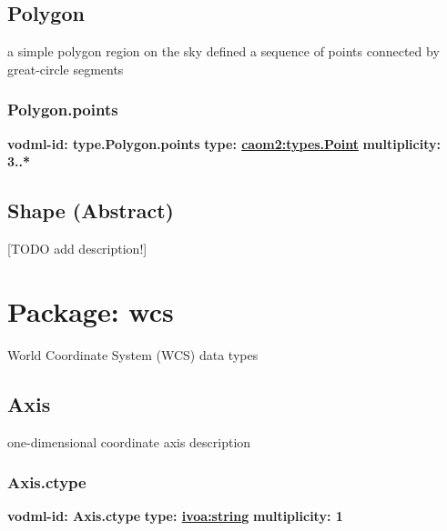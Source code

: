   \subsection{Polygon}
  \label{sect:types.Polygon}
    a simple polygon region on the sky defined a sequence of points connected by great-circle segments

    \subsubsection{Polygon.points}
      \textbf{vodml-id: type.Polygon.points} \newline
      \textbf{type: \hyperref[sect:types.Point]{caom2:types.Point}} \newline
      \textbf{multiplicity: 3..*} 

  \subsection{Shape (Abstract)}
  \label{sect:types.Shape}
    [TODO add description!]

\pagebreak
\section{Package: wcs }


  World Coordinate System (WCS) data types

  \subsection{Axis}
  \label{sect:Axis}
    one-dimensional coordinate axis description

    \subsubsection{Axis.ctype}
      \textbf{vodml-id: Axis.ctype} \newline
      \textbf{type: \hyperref[sect:ivoa]{ivoa:string}} \newline
      \textbf{multiplicity: 1} 

